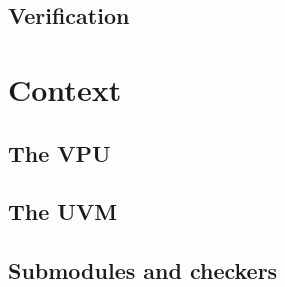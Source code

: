 

\subsection{Verification}


\section{Context}
\subsection{The VPU}
\subsection{The UVM}
\subsection{Submodules and checkers}